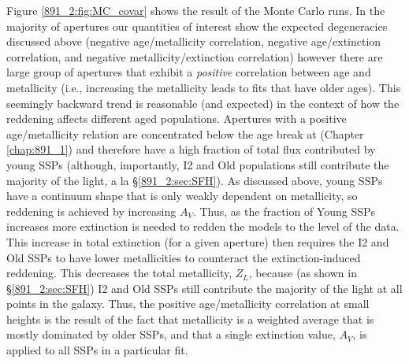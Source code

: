 Figure \ref{891_2:fig:MC_covar} shows the result of the Monte Carlo
runs. In the majority of apertures our quantities of interest show the
expected degeneracies discussed above (negative age/metallicity
correlation, negative age/extinction correlation, and negative
metallicity/extinction correlation) however there are large group of
apertures that exhibit a \emph{positive} correlation between age and
metallicity (i.e., increasing the metallicity leads to fits that have
older ages). This seemingly backward trend is reasonable (and
expected) in the context of how the reddening affects different aged
populations. Apertures with a positive age/metallicity relation are
concentrated below the age break at  (Chapter
\ref{chap:891_1}) and therefore have a high fraction of total flux
contributed by young SSPs (although, importantly, I2 and Old
populations still contribute the majority of the light, a la
\S\ref{891_2:sec:SFH}). As discussed above, young SSPs have a
continuum shape that is only weakly dependent on metallicity, so
reddening is achieved by increasing $A_V$. Thus, as the fraction of
Young SSPs increases more extinction is needed to redden the models to
the level of the data. This increase in total extinction (for a given
aperture) then requires the I2 and Old SSPs to have lower
metallicities to counteract the extinction-induced reddening. This
decreases the total metallicity, $Z_L$, because (as shown in
\S\ref{891_2:sec:SFH}) I2 and Old SSPs still contribute the majority
of the light at all points in the galaxy. Thus, the positive
age/metallicity correlation at small heights is the result of the fact
that metallicity is a weighted average that is mostly dominated by
older SSPs, and that a single extinction value, $A_V$, is applied to
all SSPs in a particular fit.





